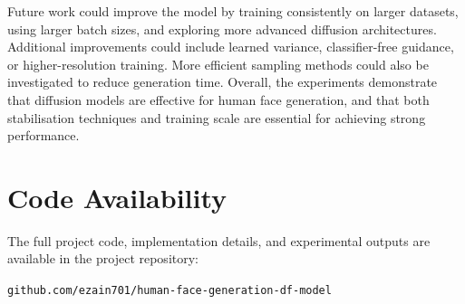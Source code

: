\documentclass[conference]{IEEEtran}
\begin{document}
Future work could improve the model by training consistently on larger datasets, using larger batch sizes, and exploring more advanced diffusion architectures. Additional improvements could include learned variance, classifier-free guidance, or higher-resolution training. More efficient sampling methods could also be investigated to reduce generation time. Overall, the experiments demonstrate that diffusion models are effective for human face generation, and that both stabilisation techniques and training scale are essential for achieving strong performance.


\section*{Code Availability}

The full project code, implementation details, and experimental outputs are available in the project repository:

\begin{center}

\footnotesize

\texttt{github.com/ezain701/human-face-generation-df-model}

\end{center}
\end{document}
